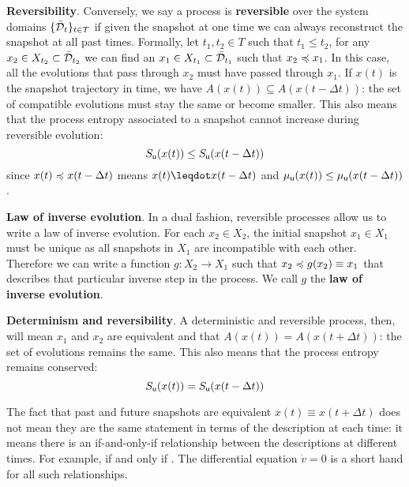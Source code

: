 \documentclass[10pt, onecolumn, longbibliography, nofootinbib]{revtex4-2}
\begin{document}
\textbf{Reversibility}. Conversely, we say a process is \textbf{reversible} over the system domains $\{\tdomain_t\}_{t \in T}$ if given the snapshot at one time we can always reconstruct the snapshot at all past times. Formally, let $t_1, t_2 \in T$ such that $t_1 \leq t_2$, for any $x_2 \in X_{t_2} \subset \tdomain_{t_2}$ we can find an $x_1 \in X_{t_1} \subset \tdomain_{t_1}$ such that $x_2 \narrower x_1$. In this case, all the evolutions that pass through $x_2$ must have passed through $x_1$. If $x(t)$ is the snapshot trajectory in time, we have $A(x(t)) \subseteq A(x(t - \Delta t))$: the set of compatible evolutions must stay the same or become smaller.  This also means that the process entropy associated to a snapshot cannot increase during reversible evolution:
\begin{equation}\label{entropy_reversibility}
	S_{\stmt[u]}(x(t)) \leq S_{\stmt[u]}(x(t - \Delta t))
\end{equation}
since $x(t)\narrower x(t-\Delta t)$ means $x(t) \finer x(t-\Delta t)$ and $\mu_{\stmt[u]}(x(t)) \leq \mu_{\stmt[u]}(x(t-\Delta t))$.

\textbf{Law of inverse evolution}. In a dual fashion, reversible processes allow us to write a law of inverse evolution. For each $x_2 \in X_2$, the initial snapshot $x_1 \in X_1$ must be unique as all snapshots in $X_1$ are incompatible with each other. Therefore we can write a function $g : X_2 \to X_1$ such that $x_2 \narrower g(x_2) \equiv x_1$ that describes that particular inverse step in the process. We call $g$ the \textbf{law of inverse evolution}.

\textbf{Determinism and reversibility}. A deterministic and reversible process, then, will mean $x_1$ and $x_2$ are equivalent and that  $A(x(t)) = A(x(t + \Delta t))$: the set of evolutions remains the same. This also means that the process entropy remains conserved:
\begin{equation}\label{entropy_detrev}
	S_{\stmt[u]}(x(t)) = S_{\stmt[u]}(x(t - \Delta t))
\end{equation}

The fact that past and future snapshots are equivalent $x(t) \equiv x(t + \Delta t)$ does not mean they are the same statement in terms of the description at each time: it means there is an if-and-only-if relationship between the descriptions at different times. For example,  if and only if . The differential equation $\dot{v} = 0$ is a short hand for all such relationships.
\end{document}
